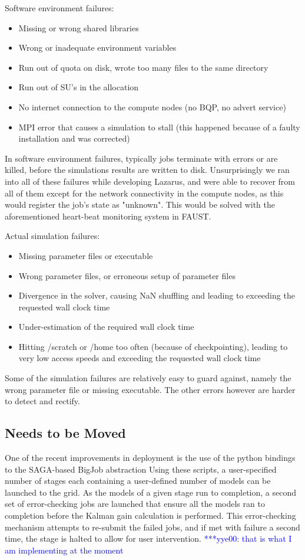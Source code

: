 \documentclass[conference,final]{IEEEtran}
\newcommand{\jhanote}[1]{ {\textcolor{red} { ***Jha: #1 }}}
\newcommand{\yyenote}[1]{ {\textcolor{blue} { ***yye00: #1 }}}
\newcommand{\jhanote}[1]{}
\newcommand{\yyenote}[1]{}
\begin{document}
Software environment failures:
\begin{itemize}
\item{Missing or wrong shared libraries}
\item{Wrong or inadequate environment variables}
\item{Run out of quota on disk, wrote too many files to the same directory}
\item{Run out of SU's in the allocation}
\item{No internet connection to the compute nodes (no BQP, no advert service)}
\item{MPI error that causes a simulation to stall (this happened because of a faulty installation and was corrected)}
\end{itemize}
In software environment failures, typically jobs terminate with errors or 
are killed, before the simulations results are written to disk. Unsurprisingly we ran
into all of these failures while developing Lazarus, and were able
to recover from all of them except for the network connectivity in the compute
nodes, as this would register the job's state as "unknown". This would be solved
with the aforementioned heart-beat monitoring system in FAUST.

Actual simulation failures:
\begin{itemize}
\item{Missing parameter files or executable}
\item{Wrong parameter files, or erroneous setup of parameter files}
\item{Divergence in the solver, causing NaN shuffling and leading to exceeding the requested wall clock time}
\item{Under-estimation of the required wall clock time}
\item{Hitting /scratch or /home too often (because of checkpointing), leading to very low access speeds and exceeding the requested wall clock time}
\end{itemize}
Some of the simulation failures are relatively easy to guard against,
namely the wrong parameter file or missing executable. The other errors
however are harder to detect and rectify.

\subsection{Needs to be Moved}
One of the recent improvements in deployment is the use of the python
bindings to the SAGA-based BigJob abstraction %
Using these scripts, a user-specified number of stages each containing
a user-defined number of models can be launched to the grid. As the
models of a given stage run to completion, a second set of
error-checking jobs are launched that ensure all the models ran to
completion before the Kalman gain calculation is performed. This
error-checking mechanism attempts to re-submit the failed jobs, and if
met with failure a second time, the stage is halted to allow for user
intervention. \yyenote{that is what I am implementing at the moment}
\end{document}
